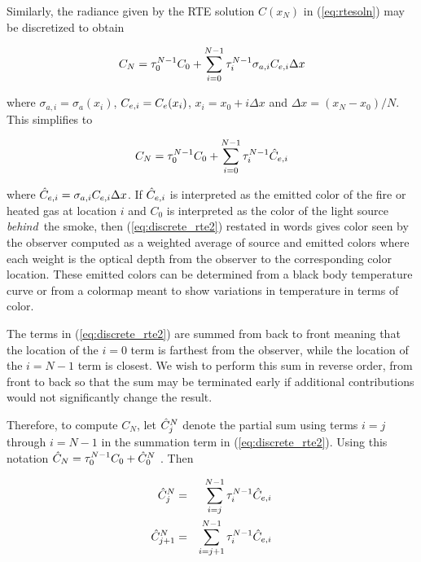 Similarly, the radiance given by the RTE solution $C(x_N)$ in (\ref{eq:rtesoln}) may be discretized to obtain

\begin{eqnarray*}
C_{N} = \tau_{0}^{N-1}C_0 +
\sum_{i=0}^{N-1}\tau_{i}^{N-1}\sigma_{a,i}C_{e,i}\Delta x
\end{eqnarray*}

where $\sigma_{a,i}=\sigma_a(x_i)$, $C_{e,i}=C_e(x_i)$, $x_i=x_0+i\Delta x$ and $\Delta x=(x_N-x_0)/N$.
This simplifies to

\begin{equation}
\label{eq:discrete_rte2}
C_N = \tau_{0}^{N-1}C_0 + \sum_{i=0}^{N-1}\tau_{i}^{N-1}\hat{C}_{e,i}
\end{equation}

where $\hat{C}_{e,i}=\sigma_{a,i}C_{e,i}\Delta x$.  If $\hat{C}_{e,i}$ is interpreted as the emitted color of the fire or heated gas at location $i$ and $C_0$ is interpreted as the color  of the light source {\em behind}\ the smoke, then (\ref{eq:discrete_rte2}) restated in words gives color seen by the observer computed as a weighted average of source and emitted colors where each weight is the optical depth from the observer to the corresponding color location.  These emitted colors can be determined from a black body temperature curve or from a colormap meant to show variations in temperature in terms of color.


The terms in (\ref{eq:discrete_rte2}) are summed from back to front meaning that the location of the $i=0$ term is farthest from the observer, while the location of the $i=N-1$ term is closest.  We wish to perform this sum in reverse order, from front to back so that the sum may be terminated early if additional contributions would not significantly change the result.

Therefore, to compute $C_N$, let $\hat{C}_{j}^N$ denote the partial sum using terms $i=j$ through $i=N-1$ in the summation term in (\ref{eq:discrete_rte2}).  Using this notation $\hat{C}_N=\tau_{0}^{N-1}C_0+\hat{C}_{0}^N$ . Then

\begin{eqnarray}
\label{eq:recurse1}
\hat{C}_{j}^N &= &\sum_{i=j}^{N-1}\tau_{i}^{N-1}\hat{C}_{e,i}\\
\label{eq:recurse2}
\hat{C}_{j+1}^N     &= &\sum_{i=j+1}^{N-1}  \tau_{i}^{N-1}\hat{C}_{e,i}
\end{eqnarray}

